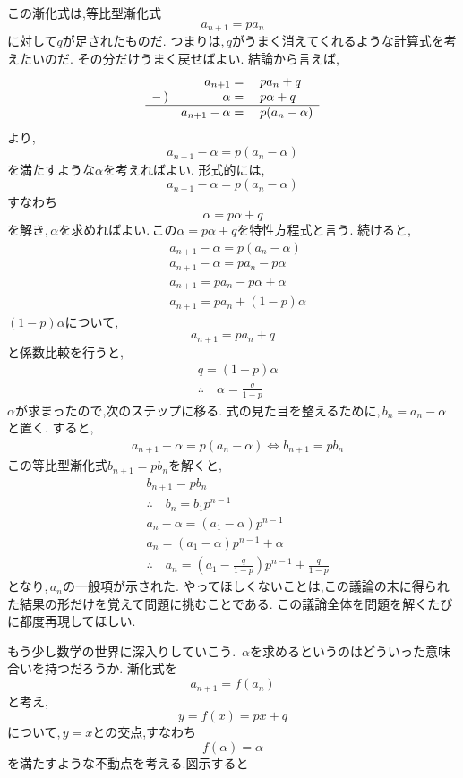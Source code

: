   この漸化式は,等比型漸化式
  \[
    a_{n+1}=pa_n
  \]
  に対して$q$が足されたものだ.
  つまりは,\,$q$がうまく消えてくれるような計算式を考えたいのだ.
  その分だけうまく戻せばよい.
  結論から言えば,
  \[
    \begin{array}{rrl}
       & a_{n+1}={} & pa_n+q\\
      -\,) & \alpha={} & p\alpha+q\\ \hline
       & a_{n+1}-\alpha={} & p(a_n-\alpha)
    \end{array}
  \]
  より,
  \[
    a_{n+1}-\alpha=p(a_n-\alpha)
  \]
  を満たすような$\alpha$を考えればよい.
  形式的には,
  \[
    a_{n+1}-\alpha=p(a_n-\alpha)
  \]
  すなわち
  \[
    \alpha=p\alpha+q
  \]
  を解き,\,$\alpha$を求めればよい.\,この$\alpha=p\alpha+q$を特性方程式と言う.
  続けると,
  \begin{align*}
    &a_{n+1}-\alpha=p(a_n-\alpha)\\
    &a_{n+1}-\alpha=pa_n-p\alpha\\
    &a_{n+1}=pa_n-p\alpha+\alpha\\
    &a_{n+1}=pa_n+(1-p)\alpha
  \end{align*}
  $(1-p)\alpha$について,
  \[
    a_{n+1}=pa_n+q
  \]
  と係数比較を行うと,
  \begin{align*}
    &q=(1-p)\alpha\\
    &\therefore \quad \alpha=\frac{q}{1-p}
  \end{align*}
  $\alpha$が求まったので,次のステップに移る.
  式の見た目を整えるために,\,$b_n=a_n-\alpha$と置く.
  すると,
  \begin{align*}
    &a_{n+1}-\alpha=p(a_n-\alpha) \iff b_{n+1}=pb_n
  \end{align*}
  この等比型漸化式$b_{n+1}=pb_n$を解くと,
  \begin{align*}
    &b_{n+1}=pb_n\\
    &\therefore \quad b_n=b_1p^{n-1}\\
    &a_n-\alpha=(a_1-\alpha)p^{n-1}\\
    &a_n=(a_1-\alpha)p^{n-1}+\alpha\\
    &\therefore \quad a_n=\left(a_1-\frac{q}{1-p}\right)p^{n-1}+\frac{q}{1-p}
  \end{align*}
  となり,\,$a_n$の一般項が示された.
  やってほしくないことは,この議論の末に得られた結果の形だけを覚えて問題に挑むことである.
  この議論全体を問題を解くたびに都度再現してほしい.

  もう少し数学の世界に深入りしていこう.
  \,$\alpha$を求めるというのはどういった意味合いを持つだろうか.
  漸化式を
  \[
    a_{n+1}=f(a_n)
  \]
  と考え,
  \[
    y=f(x)=px+q
  \]
  について,\,$y=x$との交点,すなわち
  \[
    f(\alpha)=\alpha
  \]
  を満たすような不動点を考える.図示すると

